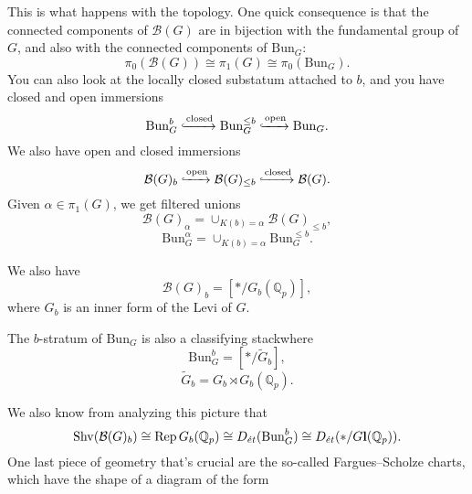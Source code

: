 \documentclass[reqno]{amsart} 
\begin{document}
This is what happens with the topology.  One quick consequence is that the connected components of $\mathcal{B}(G)$ are in bijection with the fundamental group of
$G$, and also with the connected components of $\mathrm{Bun}_G$:
\begin{equation*}
  \pi_0(\mathcal{B}(G)) \cong \pi_1(G)
  \cong \pi_0(\mathrm{Bun}_G).
\end{equation*}
You can also look at the locally closed substatum attached to $b$, and you have closed  and open immersions
\begin{equation*}
  \mathrm{Bun}_G^{b} \xhookrightarrow{\text{closed}} \mathrm{Bun}_G^{\leq b} \xhookrightarrow{\text{open}}\mathrm{Bun}_G.
\end{equation*}
We also have open and closed immersions
\begin{equation*}
  \mathcal{B}(G)_b \xhookrightarrow{\text{open}} \mathcal{B}(G)_{\leq b} \xhookrightarrow{\text{closed}} \mathcal{B}(G).
\end{equation*}
Given $\alpha \in \pi_1(G)$, we get filtered unions
\begin{equation*}
  \mathcal{B}(G)_\alpha = \cup_{K(b) = \alpha}
  \mathcal{B}(G)_{\leq b},
\end{equation*}
\begin{equation*}
  \mathrm{Bun}_G^\alpha = \cup_{K(b) = \alpha} \mathrm{Bun}_G^{\leq b}.
\end{equation*}

We also have
\begin{equation*}
  \mathcal{B}(G)_b =[\ast / G_b(\mathbb{Q}_p)],
\end{equation*}
where $G_b$ is an inner form of the Levi of $G$.

The $b$-stratum of $\mathrm{Bun}_G$ is also a classifying stackwhere
\begin{equation*}
  \mathrm{Bun}_G^{b} =[\ast / \tilde{G}_b],
\end{equation*}
\begin{equation*}
  \tilde{G}_b = G_b \rtimes G_b(\mathbb{Q}_p).
\end{equation*}

We also know from analyzing this picture that
\begin{equation*}
  \operatorname{Shv}(\mathcal{B}(G)_b) \cong \operatorname{Rep} G_b(\mathbb{Q}_p)
  \cong D_{\acute{e}t}(\mathrm{Bun}_G^b)
  \cong
  D_{\acute{e}t}(\ast / G \mathbf{l}(\mathbb{Q}_p)).
\end{equation*}
One last piece of geometry that's crucial are the so-called Fargues--Scholze charts, which have the shape of a diagram of the form
\end{document}
